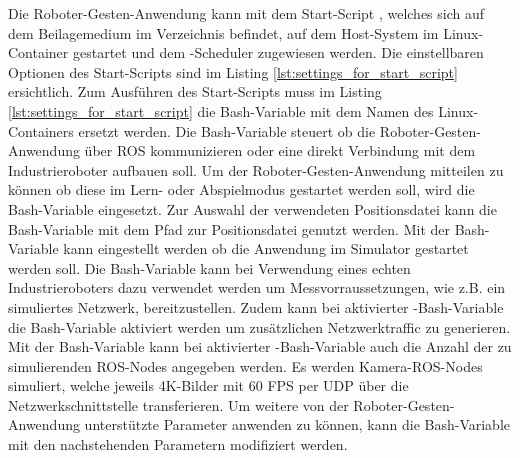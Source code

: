 Die Roboter-Gesten-Anwendung kann mit dem Start-Script , welches sich auf dem Beilagemedium im Verzeichnis  befindet, auf dem Host-System im Linux-Container gestartet und dem -Scheduler zugewiesen werden. Die einstellbaren Optionen des Start-Scripts sind im Listing \ref{lst:settings_for_start_script} ersichtlich. Zum Ausführen des Start-Scripts muss im Listing \ref{lst:settings_for_start_script} die Bash-Variable  mit dem Namen des Linux-Containers ersetzt werden. Die Bash-Variable  steuert ob die Roboter-Gesten-Anwendung über ROS kommunizieren oder eine direkt Verbindung mit dem Industrieroboter aufbauen soll. Um der Roboter-Gesten-Anwendung mitteilen zu können ob diese im Lern- oder Abspielmodus gestartet werden soll, wird die Bash-Variable  eingesetzt. Zur Auswahl der verwendeten Positionsdatei kann die Bash-Variable  mit dem Pfad zur Positionsdatei genutzt werden. Mit der Bash-Variable  kann eingestellt werden ob die Anwendung im Simulator gestartet werden soll. Die Bash-Variable  kann bei Verwendung eines echten Industrieroboters dazu verwendet werden um Messvorraussetzungen, wie z.B. ein simuliertes Netzwerk, bereitzustellen. Zudem kann bei aktivierter -Bash-Variable die Bash-Variable  aktiviert werden um zusätzlichen Netzwerktraffic zu generieren. Mit der Bash-Variable  kann bei aktivierter -Bash-Variable auch die Anzahl der zu simulierenden ROS-Nodes angegeben werden. Es werden Kamera-ROS-Nodes simuliert, welche jeweils 4K-Bilder mit 60 FPS per UDP über die Netzwerkschnittstelle transferieren. Um weitere von der Roboter-Gesten-Anwendung unterstützte Parameter anwenden zu können, kann die Bash-Variable  mit den nachstehenden Parametern modifiziert werden.

